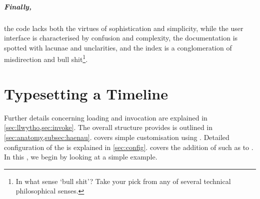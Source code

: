 \documentclass[10pt,british,a4paper]{ltxdoc}
\newcommand*\pkg[1]{\textpkg{#1}}
\begin{document}
\textbf{}

\subparagraph*{Finally,} the code lacks both the virtues of sophistication and simplicity, while the user interface is characterised by confusion and complexity, the documentation is spotted with lacunae and unclarities, and the index is a conglomeration of misdirection and bull shit\footnote{In what sense ‘bull shit’? Take your pick from any of several technical philosophical senses.}.

\textbf{}



\section{Typesetting a Timeline}\label{sec:ee}

Further details concerning loading and invocation are explained in \cref{sec:llwytho,sec:invoke}.
The overall structure \pkg{chronos} provides is outlined in \cref{sec:anatomy,subsec:haenau}.
 covers simple customisation using \conceptname[idx as={colour scheme,chronos style},no idx]{\colschemeslabelname,\chronosstyleslabelname}.
Detailed configuration  of the  is explained in \cref{sec:config}.
 covers the addition of \conceptname[idx as=element,type=concept,no idx]{\elementslabelname} such as  to .
In this , we begin by looking at a simple example.
\end{document}
